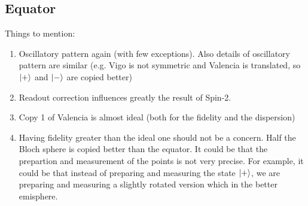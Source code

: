 \subsection{Equator}
Things to mention:
\begin{enumerate}
  \item Oscillatory pattern again (with few exceptions). Also details of oscillatory pattern are similar (e.g. Vigo is not symmetric and Valencia is translated, so $\ket{+}$ and $\ket{-}$ are copied better)
  \item Readout correction influences greatly the result of Spin-2. 
  \item Copy 1 of Valencia is almost ideal (both for the fidelity and the dispersion)
  \item Having fidelity greater than the ideal one should not be a concern. Half the Bloch sphere is copied better than the equator. 
  It could be that the prepartion and measurement of the points is not very precise. For example, it could be that instead of preparing and measuring the state $\ket{+}$, we are preparing and measuring a slightly rotated version which in the better emisphere.
\end{enumerate} 

